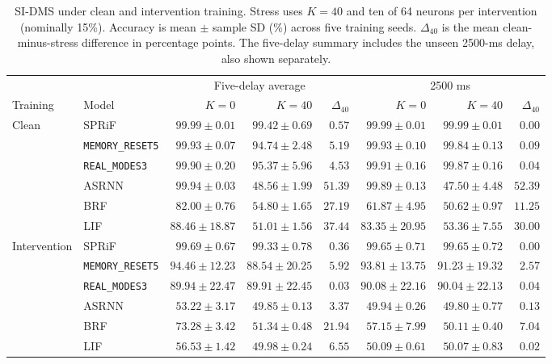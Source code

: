 \documentclass[letterpaper,journal]{IEEEtran}
\newcommand{\mr}{\textnormal{\texttt{MEMORY\_RESET5}}}
\newcommand{\rmodes}{\textnormal{\texttt{REAL\_MODES3}}}
\begin{document}
\begin{table}[t]
\caption{SI-DMS under clean and intervention training. Stress uses $K=40$ and ten of 64 neurons per intervention (nominally 15\%). Accuracy is mean $\pm$ sample SD (\%) across five training seeds. $\Delta_{40}$ is the mean clean-minus-stress difference in percentage points. The five-delay summary includes the unseen 2500-ms delay, also shown separately.}
\label{tab:sidms_results}
\centering\footnotesize\setlength{\tabcolsep}{4pt}
\renewcommand{\arraystretch}{0.90}
\begin{tabular}{@{}llrrrrrr@{}}
\toprule
& & \multicolumn{3}{c}{Five-delay average} & \multicolumn{3}{c}{2500 ms}\\
\cmidrule(lr){3-5}\cmidrule(l){6-8}
Training & Model & $K=0$ & $K=40$ & $\Delta_{40}$ & $K=0$ & $K=40$ & $\Delta_{40}$\\
\midrule
Clean & SPRiF & $99.99\pm0.01$ & $99.42\pm0.69$ & $0.57$ & $99.99\pm0.01$ & $99.99\pm0.01$ & $0.00$\\
 & \mr & $99.93\pm0.07$ & $94.74\pm2.48$ & $5.19$ & $99.93\pm0.10$ & $99.84\pm0.13$ & $0.09$\\
 & \rmodes & $99.90\pm0.20$ & $95.37\pm5.96$ & $4.53$ & $99.91\pm0.16$ & $99.87\pm0.16$ & $0.04$\\
 & ASRNN & $99.94\pm0.03$ & $48.56\pm1.99$ & $51.39$ & $99.89\pm0.13$ & $47.50\pm4.48$ & $52.39$\\
 & BRF & $82.00\pm0.76$ & $54.80\pm1.65$ & $27.19$ & $61.87\pm4.95$ & $50.62\pm0.97$ & $11.25$\\
 & LIF & $88.46\pm18.87$ & $51.01\pm1.56$ & $37.44$ & $83.35\pm20.95$ & $53.36\pm7.55$ & $30.00$\\
\midrule
Intervention & SPRiF & $99.69\pm0.67$ & $99.33\pm0.78$ & $0.36$ & $99.65\pm0.71$ & $99.65\pm0.72$ & $0.00$\\
 & \mr & $94.46\pm12.23$ & $88.54\pm20.25$ & $5.92$ & $93.81\pm13.75$ & $91.23\pm19.32$ & $2.57$\\
 & \rmodes & $89.94\pm22.47$ & $89.91\pm22.45$ & $0.03$ & $90.08\pm22.16$ & $90.04\pm22.13$ & $0.04$\\
 & ASRNN & $53.22\pm3.17$ & $49.85\pm0.13$ & $3.37$ & $49.94\pm0.26$ & $49.80\pm0.77$ & $0.13$\\
 & BRF & $73.28\pm3.42$ & $51.34\pm0.48$ & $21.94$ & $57.15\pm7.99$ & $50.11\pm0.40$ & $7.04$\\
 & LIF & $56.53\pm1.42$ & $49.98\pm0.24$ & $6.55$ & $50.09\pm0.61$ & $50.07\pm0.83$ & $0.02$\\
\bottomrule
\end{tabular}
\end{table}
\end{document}

